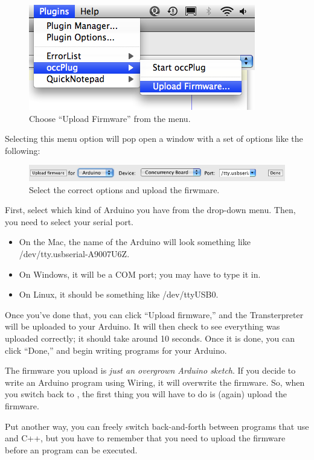 \begin{figure}[!ht]
	\centering
		\includegraphics[width=0.6\linewidth]{images/20110115-upload-firmware}
	\caption{Choose ``Upload Firmware'' from the \occplug menu.}
	\label{images:20110115-upload-firmware}
\end{figure}

Selecting this menu option will pop open a window with a set of options like the following:

\begin{figure}[!ht]
	\centering
		\includegraphics[width=0.9\linewidth]{images/20110115-upload-firmware-window}
	\caption{Select the correct options and upload the firwmare.}
	\label{images:20110115-upload-firmware-window}
\end{figure}

First, select which kind of Arduino you have from the drop-down menu. Then, you need to select your serial port.

\begin{itemize}
	\item On the Mac, the name of the Arduino will look something like {\code /dev/tty.usbserial-A9007U6Z}. 
	\item On Windows, it will be a COM port; you may have to type it in.
	\item On Linux, it should be something like {\code /dev/ttyUSB0}.
\end{itemize}

\newpage

Once you've done that, you can click ``Upload firmware,'' and the Transterpreter will be uploaded to your Arduino. It will then check to see everything was uploaded correctly; it should take around 10 seconds. Once it is done, you can click ``Done,'' and begin writing \occam programs for your Arduino.

\vspace{1cm}
\begin{warning}
The firmware you upload is {\em just an overgrown Arduino sketch}. If you decide to write an Arduino program using Wiring, it will overwrite the \plumbing firmware. So, when you switch back to \occam, the first thing you will have to do is (again) upload the firmware.
\end{warning}
\vspace{1cm}

Put another way, you can freely switch back-and-forth between programs that use \occam and C++, but you have to remember that you need to upload the firmware before an \occam program can be executed.